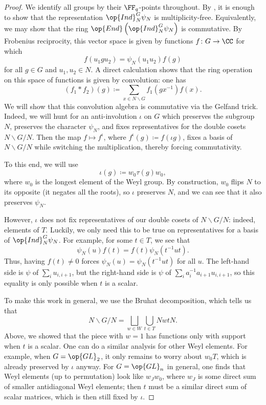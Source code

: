 \documentclass[../notes.tex]{subfiles}
\begin{document}
\begin{proof}
	We identify all groups by their $\FF_q$-points throughout. By , it is enough to show that the representation $\op{Ind}_N^G\psi_N$ is multiplicity-free. Equivalently, we may show that the ring $\op{End}\left(\op{Ind}_N^G\psi_N\right)$ is commutative. By Frobenius reciprocity, this vector space is given by functions $f\colon G\to\CC$ for which
	\[f(u_1gu_2)=\psi_N(u_1u_2)f(g)\]
	for all $g\in G$ and $u_1,u_2\in N$. A direct calculation shows that the ring operation on this space of functions is given by convolution: one has
	\[(f_1*f_2)(g)\coloneqq\sum_{x\in N\backslash G}f_1\left(gx^{-1}\right)f(x).\]
	We will show that this convolution algebra is commutative via the Gelfand trick. Indeed, we will hunt for an anti-involution $\iota$ on $G$ which preserves the subgroup $N$, preserves the character $\psi_N$, and fixes representatives for the double cosets $N\backslash G/N$. Then the map $f\mapsto f^\iota$, where $f^\iota(g)\coloneqq f(\iota g)$, fixes a basis of $N\backslash G/N$ while switching the multiplication, thereby forcing commutativity.

	To this end, we will use
	\[\iota(g)\coloneqq w_0\tau(g)w_0,\]
	where $w_0$ is the longest element of the Weyl group. By construction, $w_0$ flips $N$ to its opposite (it negates all the roots), so $\iota$ preserves $N$, and we can see that it also preserves $\psi_N$.

	However, $\iota$ does not fix representatives of our double cosets of $N\backslash G/N$: indeed, elements of $T$. Luckily, we only need this to be true on representatives for a basis of $\op{Ind}_N^G\psi_N$. For example, for some $t\in T$, we see that
	\[\psi_N(u)f(t)=f(t)\psi_N\left(t^{-1}ut\right).\]
	Thus, having $f(t)\ne0$ forces $\psi_N(u)=\psi_N\left(t^{-1}ut\right)$ for all $u$. The left-hand side is $\psi$ of $\sum_iu_{i,i+1}$, but the right-hand side is $\psi$ of $\sum_ia_i^{-1}a_{i+1}u_{i,i+1}$, so this equality is only possible when $t$ is a scalar.

	To make this work in general, we use the Bruhat decomposition, which tells us that
	\[N\backslash G/N=\bigsqcup_{w\in W}\bigcup_{t\in T}NwtN.\]
	Above, we showed that the piece with $w=1$ has functions only with support when $t$ is a scalar. One can do a similar analysis for other Weyl elements. For example, when $G=\op{GL}_2$, it only remains to worry about $w_0T$, which is already preserved by $\iota$ anyway. For $G=\op{GL}_n$ in general, one finds that Weyl elements (up to permutation) look like $w_Jw_0$, where $w_J$ is some direct sum of smaller antidiagonal Weyl elements; then $t$ must be a similar direct sum of scalar matrices, which is then still fixed by $\iota$.
	

\end{proof}
\end{document}
